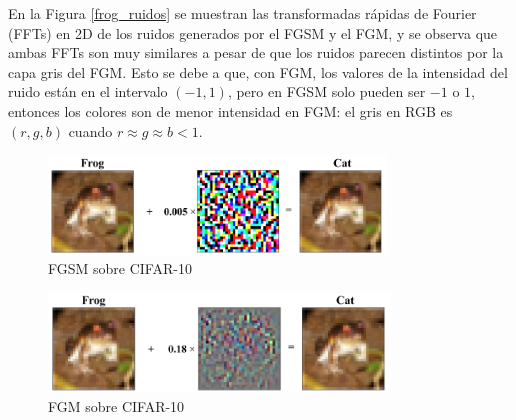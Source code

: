 En la Figura \ref{frog_ruidos} se muestran las transformadas rápidas de Fourier (FFTs) en 2D de los ruidos generados por el FGSM y el FGM, y se observa que ambas FFTs son muy similares a pesar de que los ruidos parecen distintos por la capa gris del FGM. Esto se debe a que, con FGM, los valores de la intensidad del ruido están en el intervalo $(-1, 1)$, pero en FGSM solo pueden ser $-1$ o $1$, entonces los colores son de menor intensidad en FGM: el gris en RGB es $(r,g,b)$ cuando $r \approx g \approx b < 1$.

\begin{figure}[h!]
    \centering
    \includegraphics[width=0.80\textwidth]{images/cifar-10/frog_cat_fgsm.png}
    \caption{FGSM sobre CIFAR-10}
    \label{frog_cat_fgsm}
\end{figure}

\begin{figure}[h!]
    \centering
    \includegraphics[width=0.81\textwidth]{images/cifar-10/frog_cat_fgm.png}
    \caption{FGM sobre CIFAR-10}
    \label{frog_cat_fgm}
\end{figure}

